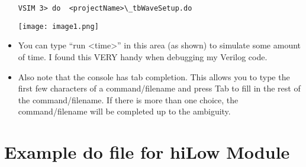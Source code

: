 \begin{itemize}
\begin{verbatim}
VSIM 3> do  <projectName>\_tbWaveSetup.do
\end{verbatim}

\texttt{[image: image1.png]}

\item
  You can type ``run \textless time\textgreater'' in this area (as
  shown) to simulate some amount of time. I found this VERY handy when
  debugging my Verilog code.
\item
  Also note that the console has tab completion. This allows you to type
  the first few characters of a command/filename and press Tab to fill
  in the rest of the command/filename. If there is more than one choice,
  the command/filename will be completed up to the ambiguity.
\end{itemize}


\section{Example do file for hiLow Module}

